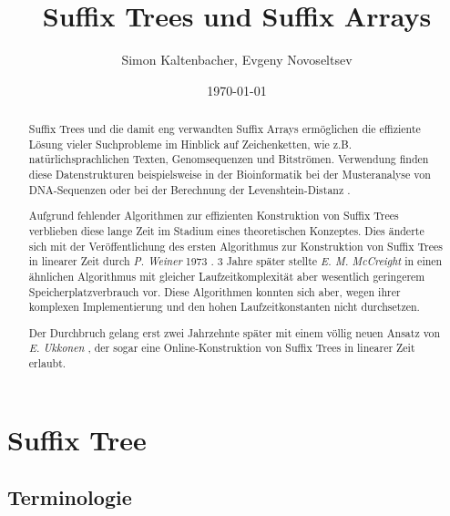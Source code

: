 \documentclass[12pt]{report}
\title{Suffix Trees und Suffix Arrays}
\author{Simon Kaltenbacher, Evgeny Novoseltsev}
\date{\today}
\begin{document}
\maketitle

\tableofcontents

\begin{abstract}
Suffix Trees und die damit eng verwandten Suffix Arrays ermöglichen die effiziente Lösung vieler Suchprobleme im Hinblick auf Zeichenketten, wie z.B. natürlichsprachlichen Texten, Genomsequenzen und Bitströmen. Verwendung finden diese Datenstrukturen beispielsweise in der Bioinformatik bei der Musteranalyse von DNA-Sequenzen \cite{Aluru2006} oder bei der Berechnung der Levenshtein-Distanz \cite{Gusfield1997}.

Aufgrund fehlender Algorithmen zur effizienten Konstruktion von Suffix Trees verblieben diese lange Zeit im Stadium eines theoretischen Konzeptes. Dies änderte sich mit der Veröffentlichung des ersten Algorithmus zur Konstruktion von Suffix Trees in linearer Zeit durch \textit{P. Weiner} 1973 \cite{Weiner1973}. 3 Jahre später stellte \textit{E. M. McCreight} in \cite{McCreight1976} einen ähnlichen Algorithmus mit gleicher Laufzeitkomplexität aber wesentlich geringerem Speicherplatzverbrauch vor. Diese Algorithmen konnten sich aber, wegen ihrer komplexen Implementierung und den hohen Laufzeitkonstanten nicht durchsetzen.

Der Durchbruch gelang erst zwei Jahrzehnte später mit einem völlig neuen Ansatz von \textit{E. Ukkonen} \cite{Ukkonen1995}, der sogar eine Online-Konstruktion von Suffix Trees in linearer Zeit erlaubt.
\end{abstract}

\chapter{Suffix Tree}
\label{chap:SuffixTree}

\section{Terminologie}
\label{sec:Terminologie}
\end{document}
